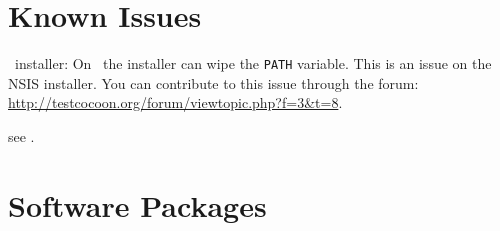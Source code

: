 \section{Known Issues}
\begin{description}
\item{\TestCocoon\ installer:}
\newline 
On \MicrosoftWindows\ the installer can wipe the \verb$PATH$ variable.
This is an issue on the NSIS installer. 
You can contribute to this issue through the forum: \url{http://testcocoon.org/forum/viewtopic.php?f=3&t=8}.

\newline 
\Workaround see .
\end{description}


\section{Software Packages}



